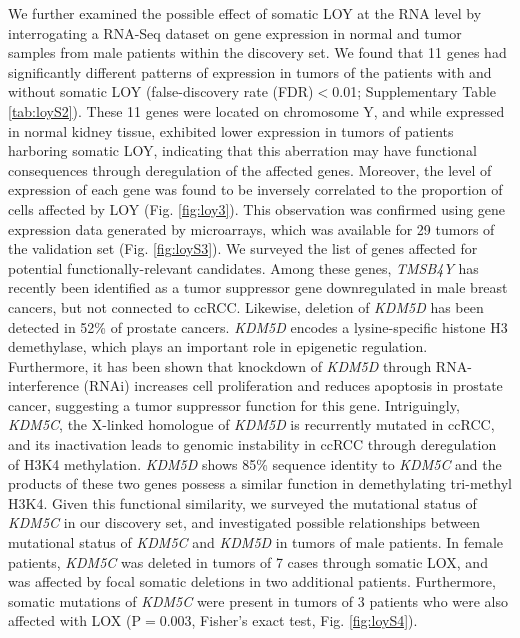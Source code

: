 We further examined the possible effect of somatic LOY at the RNA level by interrogating a RNA-Seq dataset on gene expression in normal and tumor samples from male patients within the discovery set\cite{Scelo2014}.
We found that 11 genes had significantly different patterns of expression in tumors of the patients with and without somatic LOY (false-discovery rate (FDR)$<$0.01; Supplementary Table \ref{tab:loyS2}).
These 11 genes were located on chromosome Y, and while expressed in normal kidney tissue, exhibited lower expression in tumors of patients harboring somatic LOY, indicating that this aberration may have functional consequences through deregulation of the affected genes.
Moreover, the level of expression of each gene was found to be inversely correlated to the proportion of cells affected by LOY (Fig. \ref{fig:loy3}).
This observation was confirmed using gene expression data generated by microarrays, which was available for 29 tumors of the validation set\cite{Wozniak2013} (Fig. \ref{fig:loyS3}).
We surveyed the list of genes affected for potential functionally-relevant candidates.
Among these genes, {\it TMSB4Y} has recently been identified as a tumor suppressor gene downregulated in male breast cancers\cite{Wong2015}, but not connected to ccRCC.
Likewise, deletion of {\it KDM5D} has been detected in 52\% of prostate cancers\cite{Perinchery2000}.
{\it KDM5D} encodes a lysine-specific histone H3 demethylase, which plays an important role in epigenetic regulation\cite{Lee2007}.
Furthermore, it has been shown that knockdown of {\it KDM5D} through RNA-interference (RNAi) increases cell proliferation and reduces apoptosis in prostate cancer\cite{Jangravi2015}, suggesting a tumor suppressor function for this gene.
Intriguingly, {\it KDM5C}, the X-linked homologue of {\it KDM5D} is recurrently mutated in ccRCC\cite{Scelo2014,Dalgliesh2010,Creighton2013}, and its inactivation leads to genomic instability in ccRCC through deregulation of H3K4 methylation\cite{Rondinelli2015}.
{\it KDM5D} shows 85\% sequence identity to {\it KDM5C} and the products of these two genes possess a similar function in demethylating tri-methyl H3K4\cite{Lee2007,Rondinelli2015}.
Given this functional similarity, we surveyed the mutational status of {\it KDM5C} in our discovery set, and investigated possible relationships between mutational status of {\it KDM5C} and {\it KDM5D} in tumors of male patients.
In female patients, {\it KDM5C} was deleted in tumors of 7 cases through somatic LOX, and was affected by focal somatic deletions in two additional patients.
Furthermore, somatic mutations of {\it KDM5C} were present in tumors of 3 patients who were also affected with LOX (P$=$0.003, Fisher's exact test, Fig. \ref{fig:loyS4}).
